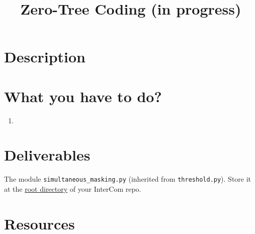 

\title{Zero-Tree Coding (in progress)}


\maketitle

\section{Description}

\section{What you have to do?}

\begin{enumerate}
\item 
\end{enumerate}

\section{Deliverables}

The module \verb|simultaneous_masking.py| (inherited from
\verb|threshold.py|). Store it at the
\href{https://github.com/Tecnologias-multimedia/intercom}{root
  directory} of your InterCom repo.

\section{Resources}



